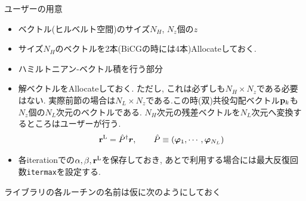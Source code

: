 \documentclass[12pt,titlepage]{jarticle}
\begin{document}
ユーザーの用意
\begin{itemize}
\item ベクトル(ヒルベルト空間)のサイズ$N_H$, $N_z$個の$z$
\item サイズ$N_H$のベクトルを2本(BiCGの時には4本)Allocateしておく.
\item ハミルトニアン-ベクトル積を行う部分
\item 解ベクトルをAllocateしておく. ただし, これは必ずしも$N_H \times N_z$である必要はない.
  実際前節の場合は$N_L \times N_z$である.この時(双)共役勾配ベクトル${{\bf p}_k}$も
  $N_z$個の$N_L$次元のベクトルである.
  $N_H$次元の残差ベクトルを$N_L$次元へ変換するところはユーザーが行う.
  \begin{align}
    {\bf r}^{\rm L} = {\hat P}^\dagger {\boldsymbol r}, \qquad
    {\hat P} \equiv ({\boldsymbol \varphi}_1, \cdots, {\boldsymbol \varphi}_{N_L})
  \end{align}
\item 各iterationでの$\alpha, \beta, {\bf r}^{\rm L}$を保存しておき, 
あとで利用する場合には最大反復回数\verb|itermax|を設定する.
\end{itemize}
ライブラリの各ルーチンの名前は仮に次のようにしておく
\end{document}
